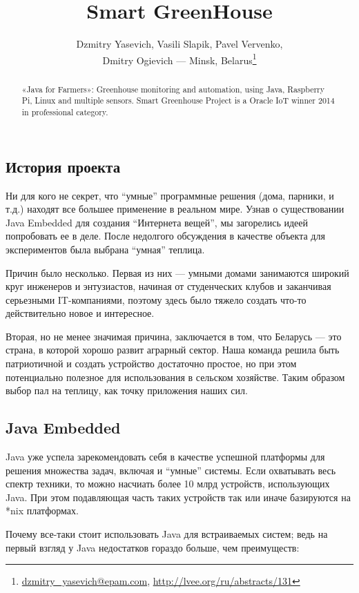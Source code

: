 \documentclass[10pt, a5paper]{article}
\begin{document}
\title{Smart GreenHouse}
\author{Dzmitry Yasevich, Vasili Slapik, Pavel Vervenko, \\
Dmitry Ogievich --- Minsk, Belarus\footnote{\url{dzmitry_yasevich@epam.com}, \url{http://lvee.org/ru/abstracts/131}}}
\maketitle
\begin{abstract}
«Java for Farmers»: Greenhouse monitoring and automation, using Java, Raspberry Pi, Linux and multiple sensors. Smart Greenhouse Project is a Oracle IoT winner 2014 in professional category.
\end{abstract}
\subsection*{История проекта}

Ни для кого не секрет, что ``умные'' программные решения (дома, парники, и т.д.) находят все большее применение в реальном мире. Узнав о существовании Java Embedded для создания ``Интернета вещей'', мы загорелись идеей попробовать ее в деле. После недолгого обсуждения в качестве объекта для экспериментов была выбрана ``умная'' теплица.

Причин было несколько. Первая из них --- умными домами занимаются широкий круг инженеров и энтузиастов, начиная от студенческих клубов и заканчивая серьезными IT-компаниями, поэтому здесь было тяжело создать что-то действительно новое и интересное.

Вторая, но не менее значимая причина, заключается в том, что Беларусь --- это страна, в которой хорошо развит аграрный сектор. Наша команда решила быть патриотичной и создать устройство достаточно простое, но при этом потенциально полезное для использования в сельском хозяйстве. Таким образом выбор пал на теплицу, как точку приложения наших сил.

\subsection*{Java Embedded}

Java уже успела зарекомендовать себя в качестве успешной платформы для решения множества задач, включая и ``умные'' системы. Если охватывать весь спектр техники, то можно насчиать более 10 млрд устройств, использующих Java. При этом подавляющая часть таких устройств так или иначе базируются на *nix платформах.

Почему все-таки стоит использовать Java для встраиваемых систем; ведь на первый взгляд у Java недостатков гораздо больше, чем преимуществ:
\end{document}
